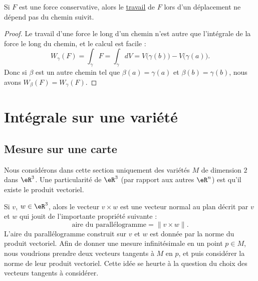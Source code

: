 \begin{proposition}
	Si $F$ est une force conservative, alors le \href{http://fr.wikipedia.org/wiki/Travail_d'une_force}{travail} de $F$ lors d'un déplacement ne dépend pas du chemin suivit.
\end{proposition}

\begin{proof}
	Le travail d'une force le long d'un chemin n'est autre que l'intégrale de la force le long du chemin, et le calcul est facile :
	\begin{equation}
		W_{\gamma}(F)=\int_{\gamma}F=\int_{\gamma}dV=V\big( \gamma(b) \big)-V\big( \gamma(a) \big).
	\end{equation}
	Donc si $\beta$ est un autre chemin tel que $\beta(a)=\gamma(a)$ et $\beta(b)=\gamma(b)$, nous avons $W_{\beta}(F)=W_{\gamma}(F)$.
\end{proof}

\section{Intégrale sur une variété}

\subsection{Mesure sur une carte}

Nous considérons dans cette section uniquement des variétés $M$ de dimension $2$ dans $\eR^3$.  Une particularité de $\eR^3$ (par rapport aux autres $\eR^n$) est qu'il existe le produit vectoriel. 

Si $v$, $w\in\eR^3$, alors le vecteur $v\times w$ est une vecteur normal au plan décrit par $v$ et $w$ qui jouit de l'importante propriété suivante :
\begin{equation}
	\text{aire du parallélogramme}=\| v\times w \|.
\end{equation}
L'aire du parallélogramme construit sur $v$ et $w$ est donnée par la norme du produit vectoriel. Afin de donner une mesure infinitésimale en un point $p\in M$, nous voudrions prendre deux vecteurs tangents à $M$ en $p$, et puis considérer la norme de leur produit vectoriel. Cette idée se heurte à la question du choix des vecteurs tangents à considérer.

